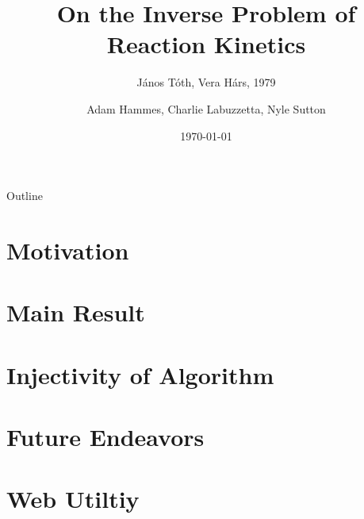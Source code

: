 \documentclass[11pt]{beamer}
\title{On the Inverse Problem of Reaction Kinetics}
\subtitle{J{\'a}nos T{\'o}th, Vera H{\'a}rs, 1979}
\author{Adam Hammes, Charlie Labuzzetta, Nyle Sutton}
\institute{Iowa State University}
\date{\today}
\begin{document}
	
	\begin{frame}
		\titlepage
	\end{frame}
	
	\begin{frame}{Outline}
		\tableofcontents
	\end{frame}
	
	\section{Motivation}
	\begin{frame}
	\end{frame}
	
	\section{Main Result}
	
	
	
	
	
	
	\section{Injectivity of Algorithm}
	
	
	
	
	\section{Future Endeavors}
	\begin{frame}
	\end{frame}
	
	\section{Web Utiltiy}
	\begin{frame}
	\end{frame}
	
\end{document}
